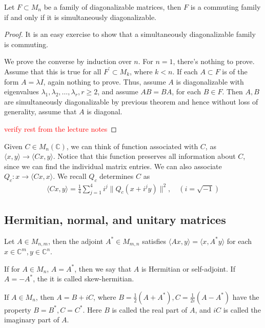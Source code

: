 

\begin{theorem}
  Let $F \subset M_n$ be a family of diagonalizable matrices, then
  $F$ is a commuting family if and only if it is simultaneously diagonalizable.
\end{theorem}
\begin{proof}
  It is an easy exercise to show that a simultaneously diagonalizable
  family is commuting.

  We prove the converse by induction over $n$. For $n = 1$, there's
  nothing to prove. Assume that this is true for all $F^\prime
  \subset M_k$, where $k < n$. If each $A \subset F$ is of the form
  $A = \lambda I$, again nothing to prove. Thus, assume $A$ is
  diagonalizable with eigenvalues $\lambda_1 , \lambda_2 , \ldots ,
  \lambda_r, r \ge 2$, and assume $AB = BA$, for each $B \in F$.
  Then $A, B$ are simultaneously diagonalizable by previous theorem
  and hence without loss of generality, assume that
  $A$ is diagonal.

  \textcolor{red}{verify rest from the lecture notes}
\end{proof}

\begin{remark}
  Given $C \in M_n(\mathbb{C})$, we can think of function associated
  with $C$, as $ \langle x , y \rangle   \to \langle Cx, y\rangle$.
  Notice that this function preserves all information about $C$,
  since we can find the individual matrix entries.
  We can also associate $Q_c : x \to \langle Cx , x \rangle$. We
  recall $Q_c$ determines $C$ as
  \begin{align*}
    \langle Cx, y \rangle = \frac{1}{4}\sum_{j = 1}^{4} i^j\|Q_c(x + i^j
    y)\|^2, \quad ( i = \sqrt{-1})
  \end{align*}
\end{remark}

\subsection{Hermitian, normal, and unitary matrices}
\begin{definition}
  Let $A \in M_{n, m}$, then the adjoint $A^* \in M_{m, n}$ satisfies
  $\langle  Ax , y \rangle  = \langle x , A^*y \rangle $ for each $x
  \in \mathbb{C}^m, y \in \mathbb{C}^n$.

  If for $A \in M_n$, $A = A^*$, then we say that $A$ is Hermitian or
  self-adjoint. If $A = - A^*$, the it is called skew-hermitian.

  If $A \in M_n$, then $A = B+ iC$, where $B = \frac{1}{2} (A + A^*),
  C = \frac{1}{2i} (A - A^*)$ have the property $B = B^*, C = C^*$.
  Here $ B$ is called the real part of $A$, and $iC$ is called the
  imaginary part of $A$.
\end{definition}

